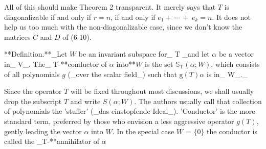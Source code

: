 All of this should make Theorem 2 transparent. It merely says that \(T\) is diagonalizable if and only if \(r=n\), if and only if \(e_{1}+\ \cdots\ +\ e_{k}=n\). It does not help us too much with the non-diagonalizable case, since we don't know the matrices \(C\) and \(D\) of (6-10).

**Definition.**_Let \(W\) be an invariant subspace for_ T _and let \(\alpha\) be a vector in_ V_. The_ T-**conductor of \(\alpha\) into**\(W\) is the set \(\mathbb{S}_{\mathrm{T}}(\alpha;W)\), which consists of all polynomials \(g\) (_over the scalar field_) such that \(\mathrm{g}(T)\alpha\) is in_ W_._

Since the operator \(T\) will be fixed throughout most discussions, we shall usually drop the subscript \(T\) and write \(S(\alpha;W)\). The authors usually call that collection of polynomials the 'stuffer' (_das einstopfende Ideal_). 'Conductor' is the more standard term, preferred by those who envision a less aggressive operator \(g(T)\), gently leading the vector \(\alpha\) into \(W\). In the special case \(W\) = \(\{0\}\) the conductor is called the _T-**annihilator of \(\alpha\) 